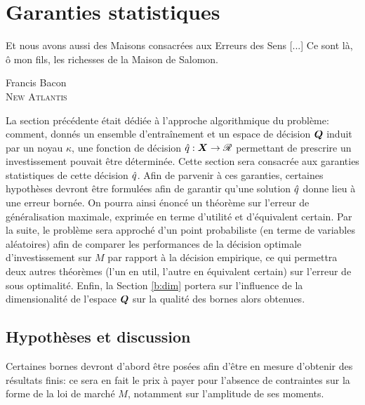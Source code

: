 \section{Garanties statistiques}
\label{sec:bound}

\epigraph{Et nous avons aussi des Maisons consacrées aux Erreurs des Sens [...] Ce sont
  là, ô mon fils, les richesses de la Maison de Salomon.}{Francis Bacon\\\textsc{New
    Atlantis}}



La section précédente était dédiée à l'approche algorithmique du problème: comment, donnés
un ensemble d'entraînement et un espace de décision $\bm Q$ induit par un noyau $\kappa$, une
fonction de décision $\hat q:\bm{X} \to \mathscr{R}$ permettant de prescrire un investissement pouvait
être déterminée. Cette section sera consacrée aux garanties statistiques de cette décision
$\hat q$. Afin de parvenir à ces garanties, certaines hypothèses devront être formulées afin
de garantir qu'une solution $\hat q$ donne lieu à une erreur bornée. On pourra ainsi énoncé
un théorème sur l'erreur de généralisation maximale, exprimée en terme d'utilité et
d'équivalent certain. Par la suite, le problème sera approché d'un point probabiliste (en
terme de variables aléatoires) afin de comparer les performances de la décision optimale
d'investissement sur $M$ par rapport à la décision empirique, ce qui permettra deux autres
théorèmes (l'un en util, l'autre en équivalent certain) sur l'erreur de sous
optimalité. Enfin, la Section \ref{b:dim} portera sur l'influence de la dimensionalité de
l'espace $\bm Q$ sur la qualité des bornes alors obtenues.

\subsection{Hypothèses et discussion}

Certaines bornes devront d'abord être posées afin d'être en mesure d'obtenir des résultats
finis: ce sera en fait le prix à payer pour l'absence de contraintes sur la forme de la
loi de marché $M$, notamment sur l'amplitude de ses moments. 

